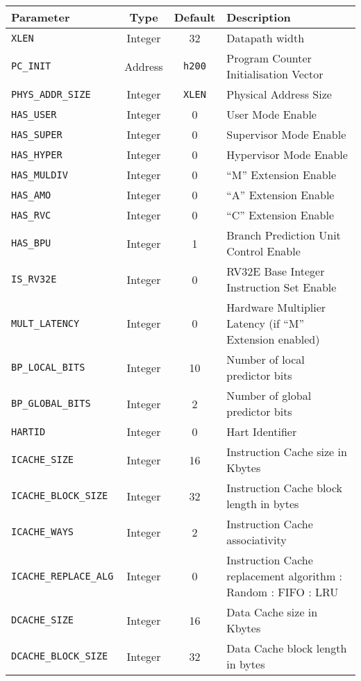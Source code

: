 \begin{longtable}[]{@{}lccp{6cm}@{}}
\toprule
	Parameter & Type & Default & Description\tabularnewline
\midrule

	\endhead



\texttt{XLEN}                 & Integer & 32                      & Datapath width\tabularnewline
\texttt{PC\_INIT}             & Address & \texttt{h200}           & Program Counter Initialisation Vector\tabularnewline
\texttt{PHYS\_ADDR\_SIZE}     & Integer & \texttt{XLEN}           & Physical Address Size\tabularnewline
\texttt{HAS\_USER}            & Integer & 0                       & User Mode Enable\tabularnewline
\texttt{HAS\_SUPER}           & Integer & 0                       & Supervisor Mode Enable\tabularnewline
\texttt{HAS\_HYPER}           & Integer & 0                       & Hypervisor Mode Enable\tabularnewline
\texttt{HAS\_MULDIV}          & Integer & 0                       & ``M'' Extension Enable\tabularnewline
\texttt{HAS\_AMO}             & Integer & 0                       & ``A'' Extension Enable\tabularnewline
\texttt{HAS\_RVC}             & Integer & 0                       & ``C'' Extension Enable\tabularnewline
\texttt{HAS\_BPU}             & Integer & 1                       & Branch Prediction Unit Control Enable\tabularnewline
\texttt{IS\_RV32E}            & Integer & 0                       & RV32E Base Integer Instruction Set Enable\tabularnewline
\texttt{MULT\_LATENCY}        & Integer & 0                       & Hardware Multiplier Latency (if ``M'' Extension enabled)\tabularnewline
\texttt{BP\_LOCAL\_BITS}      & Integer & 10                      & Number of local predictor bits\tabularnewline
\texttt{BP\_GLOBAL\_BITS}     & Integer & 2                       & Number of global predictor bits\tabularnewline
\texttt{HARTID}               & Integer & 0                       & Hart Identifier\tabularnewline
\texttt{ICACHE\_SIZE}         & Integer & 16                      & Instruction Cache size in Kbytes\tabularnewline
\texttt{ICACHE\_BLOCK\_SIZE}  & Integer & 32                      & Instruction Cache block length in bytes\tabularnewline
\texttt{ICACHE\_WAYS}         & Integer & 2                       & Instruction Cache associativity\tabularnewline
\texttt{ICACHE\_REPLACE\_ALG} & Integer & 0                       & Instruction Cache replacement algorithm
\newline0: Random
\newline1: FIFO
\newline2: LRU\tabularnewline
\texttt{DCACHE\_SIZE}         & Integer & 16                      & Data Cache size in Kbytes\tabularnewline
\texttt{DCACHE\_BLOCK\_SIZE}  & Integer & 32                      & Data Cache block length in bytes\tabularnewline

\end{longtable}
